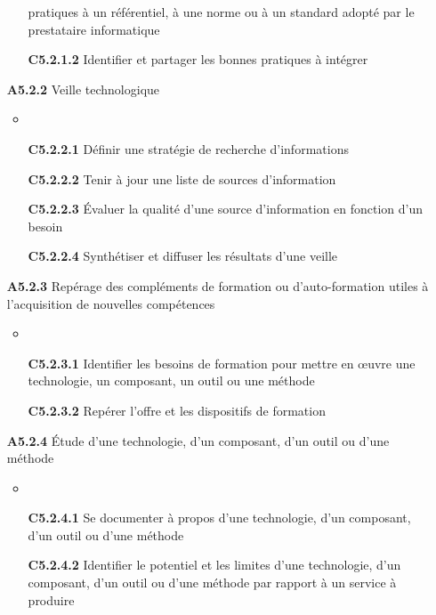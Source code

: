 \documentclass[12pt,a4paper,oneside,titlepage,final]{article}
\begin{document}
\begin{enumerate}
\begin{itemize}
    pratiques à un référentiel, à une norme ou à un standard adopté
    par le prestataire informatique
    \item [\textbf{C5.2.1.2}] Identifier et partager les bonnes
    pratiques à intégrer
  \end{itemize}
  \item [\textbf{A5.2.2}] Veille technologique
  \begin{itemize}
    \item \item [\textbf{C5.2.2.1}] Définir une stratégie de recherche
    d'informations
    \item [\textbf{C5.2.2.2}] Tenir à jour une liste de sources
    d'information
    \item [\textbf{C5.2.2.3}] Évaluer la qualité d'une source
    d'information en fonction d'un besoin
    \item [\textbf{C5.2.2.4}] Synthétiser et diffuser les résultats
    d'une veille
  \end{itemize}
  \item [\textbf{A5.2.3}] Repérage des compléments de formation ou
  d'auto-formation utiles à l'acquisition de nouvelles compétences
  \begin{itemize}
    \item \item [\textbf{C5.2.3.1}] Identifier les besoins de
    formation pour mettre en œuvre une technologie, un composant, un
    outil ou une méthode
    \item [\textbf{C5.2.3.2}] Repérer l'offre et les dispositifs de
    formation
  \end{itemize}
  \item [\textbf{A5.2.4}] Étude d'une technologie, d'un composant,
  d'un outil ou d'une méthode
  \begin{itemize}
    \item \item [\textbf{C5.2.4.1}] Se documenter à propos d'une
    technologie, d'un composant, d'un outil ou d'une méthode
    \item [\textbf{C5.2.4.2}] Identifier le potentiel et les limites
    d'une technologie, d'un composant, d'un outil ou d'une méthode par
    rapport à un service à produire
  \end{itemize}
\end{enumerate}

\clearpage%
\printbibheading%
\printbibliography[nottype=online,check=notonline,heading=subbibliography,title={Bibliographiques}]
\printbibliography[check=online,heading=subbibliography,title={Webographiques}]

\printglossaries%
\end{document}
